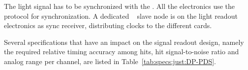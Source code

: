 The light signal has to be synchronized with the . All the  electronics use the  protocol for synchronization. A dedicated  ~\cite{utca} slave node is on the light readout  electronics as sync receiver, distributing clocks to the different  cards.

Several  specifications that have an impact on the signal readout design, namely the required relative timing accuracy among hits, hit signal-to-noise ratio and analog range per channel, are listed in Table~\ref{tab:specs:just:DP-PDS}. 
